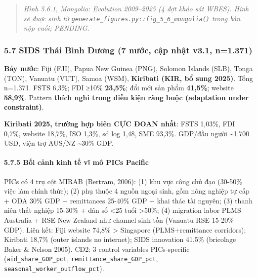 \documentclass[12pt,a4paper]{article}
\begin{document}
\begin{quote}
\emph{Hình 5.6.1, Mongolia: Evolution 2009--2025 (4 đợt khảo sát WBES).
Hình sẽ được sinh từ
\texttt{generate\_figures.py::fig\_5\_6\_mongolia()} trong bản nộp cuối;
PENDING.}
\end{quote}

\hypertarget{57-sids-thuxe1i-buxecnh-dux1b0ux1a1ng-7-nux1b0ux1edbc-cux1eadp-nhux1eadt-v31-n1371}{%
\subsubsection{5.7 SIDS Thái Bình Dương (7 nước, cập nhật v3.1,
n=1.371)}\label{57-sids-thuxe1i-buxecnh-dux1b0ux1a1ng-7-nux1b0ux1edbc-cux1eadp-nhux1eadt-v31-n1371}}

\textbf{Bảy nước}: Fiji (FJI), Papua New Guinea (PNG), Solomon Islands
(SLB), Tonga (TON), Vanuatu (VUT), Samoa (WSM), \textbf{Kiribati (KIR,
bổ sung 2025)}. Tổng n=1.371. FSTS 6,3\%; FDI ≥10\% \textbf{23,5\%}; đổi
mới sản phẩm \textbf{41,5\%}; website \textbf{58,9\%}. Pattern
\textbf{thích nghi trong điều kiện ràng buộc (adaptation under
constraint)}.

\textbf{Kiribati 2025, trường hợp biên CỰC ĐOAN nhất}: FSTS 1,03\%, FDI
0,7\%, website 18,7\%, ISO 1,3\%, sd log 1,48, SME 93,3\%. GDP/đầu người
\textasciitilde1.700 USD, viện trợ AUS/NZ \textasciitilde30\% GDP.

\hypertarget{575-bux1ed1i-cux1ea3nh-kinh-tux1ebf-vux129-muxf4-pics-pacific}{%
\paragraph{5.7.5 Bối cảnh kinh tế vĩ mô PICs
Pacific}\label{575-bux1ed1i-cux1ea3nh-kinh-tux1ebf-vux129-muxf4-pics-pacific}}

PICs có 4 trụ cột MIRAB (Bertram, 2006): (1) khu vực công chủ đạo
(30-50\% việc làm chính thức); (2) phụ thuộc 4 nguồn ngoại sinh, gồm
nông nghiệp tự cấp + ODA 30\% GDP + remittances 25-40\% GDP + khai thác
tài nguyên; (3) thanh niên thất nghiệp 15-30\% + dân số \textless25 tuổi
\textgreater50\%; (4) migration labor PLMS Australia + RSE New Zealand
như channel sinh tồn (Vanuatu RSE 15-20\% GDP). Liên kết: Fiji website
74,8\% \textgreater{} Singapore (PLMS+remittance corridors); Kiribati
18,7\% (outer islands no internet); SIDS innovation 41,5\% (bricolage
Baker \& Nelson 2005). CĐ2: 3 control variables PICs-specific
(\texttt{aid\_share\_GDP\_pct}, \texttt{remittance\_share\_GDP\_pct},
\texttt{seasonal\_worker\_outflow\_pct}).
\end{document}
